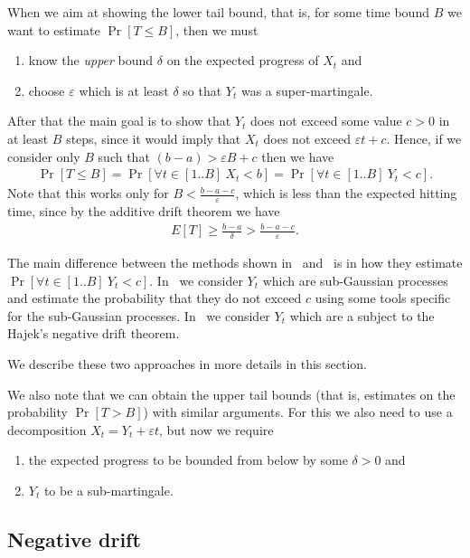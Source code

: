 \documentclass[12pt, a4paper]{article}
\theoremstyle{remark}
\theoremstyle{definition}
\newcommand{\eps}{\varepsilon}
\begin{document}
When we aim at showing the lower tail bound, that is, for some time bound $B$ we want to estimate $\Pr[T \le B]$, then we must
\begin{enumerate}
    \item know the \emph{upper} bound $\delta$ on the expected progress of $X_t$ and
    \item choose $\eps$ which is at least $\delta$ so that $Y_t$ was a super-martingale.
\end{enumerate}
After that the main goal is to show that $Y_t$ does not exceed some value $c > 0$ in at least $B$ steps, since it would imply that $X_t$ does not exceed $\eps t + c$. Hence, if we consider only $B$ such that $(b - a) > \eps B + c$  then we have 
\begin{align*}
    \Pr[T \le B] = \Pr[\forall t \in[1..B] \  X_t < b] = \Pr[\forall t \in[1..B] \  Y_t < c].
\end{align*}
Note that this works only for $B < \frac{b - a - c}{\eps}$, which is less than the expected hitting time, since by the additive drift theorem we have
\begin{align*}
    E[T] \ge \frac{b - a}{\delta} > \frac{b - a - c}{\eps}.
\end{align*}

The main difference between the methods shown in~\cite{Kotzing16} and~\cite{AntipovDK19} is in how they estimate $\Pr[\forall t \in[1..B] \  Y_t < c]$. In~\cite{Kotzing16} we consider $Y_t$ which are sub-Gaussian processes and estimate the probability that they do not exceed $c$ using some tools specific for the sub-Gaussian processes. In~\cite{AntipovDK19} we consider $Y_t$ which are a subject to the Hajek's negative drift theorem. 

We describe these two approaches in more details in this section.

We also note that we can obtain the upper tail bounds (that is, estimates on the probability $\Pr[T > B]$) with similar arguments. For this we also need to use a decomposition $X_t = Y_t + \eps t$, but now we require
\begin{enumerate}
    \item the expected progress to be bounded from below by some $\delta > 0$ and
    \item $Y_t$ to be a sub-martingale.
\end{enumerate}  

\subsection{Negative drift}
\end{document}
